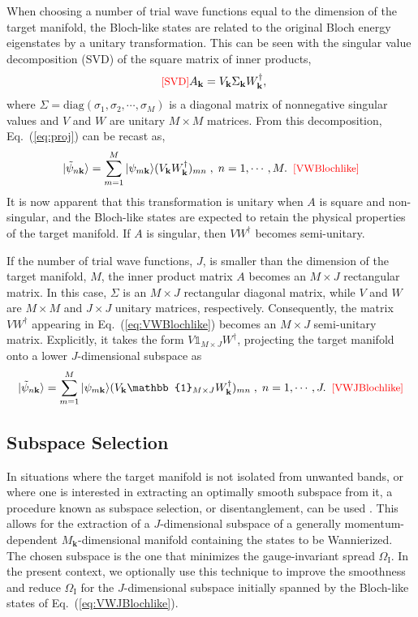 \documentclass[galley,aps,pra,10pt,amsmath,amssymb,
    superscriptaddress,nofootinbib,longbibliography]{revtex4-2}
\def\Red#1{\textcolor{red}{#1}}
\newcounter{comm}
\newcommand{\seclab}[1]{\label{sec:#1}{\Red{\small\;\;[sec:~#1]}}}
\newcommand{\eqlab}[1]{\Red{\hbox{\small\;\;[#1]}}\label{eq:#1}}
\newcommand{\eqlab}[1]{\label{eq:#1}}
\newcommand{\seclab}[1]{\label{sec:#1}}
\newcommand{\eq}[1]{Eq.~(\ref{eq:#1})}
\begin{document}
When choosing a number of trial wave functions equal to the dimension of the target manifold, the Bloch-like states are related to the original Bloch energy eigenstates by a unitary transformation. This can be seen with the singular value decomposition (SVD) of the square matrix of inner products, 
\begin{equation}
\eqlab{SVD}
    A_{\mathbf{k}} = V_{\mathbf{k}} \Sigma_{\mathbf{k}} W_{\mathbf{k}}^{\dagger} ,
\end{equation} 
where $\Sigma = \text{diag}(\sigma_1, \sigma_2, \cdots, \sigma_M)$ is a diagonal matrix of nonnegative singular values and $V$ and $W$ are unitary $M\times M$ matrices. From this decomposition, \eq{proj} can be recast as,
\begin{equation}
|\tilde{\psi}_{n\mathbf{k}} \rangle = \sum_{m=1}^M |\psi_{m\mathbf{k}} \rangle (V_{\mathbf{k}}W_{\mathbf{k}}^{\dagger})_{mn} \;,\;n=1,\cdots,M.
\eqlab{VWBlochlike}
\end{equation}
It is now apparent that this transformation is unitary when $A$ is square and non-singular, and the Bloch-like states are expected to retain the physical properties of the target manifold. If $A$ is singular, then $VW^{\dagger}$ becomes semi-unitary.

If the number of trial wave functions, $J$, is smaller than the dimension of the target manifold, $M$, the inner product matrix $A$ becomes an $M \times J$ rectangular matrix. In this case, $\Sigma$ is an $M\times J$ rectangular diagonal matrix, while $V$ and $W$ are $M\times M$ and $J \times J$ unitary matrices, respectively. Consequently, the matrix $VW^{\dagger}$ appearing in \eq{VWBlochlike} becomes an $M \times J$ semi-unitary matrix. Explicitly, it takes the form $V \mathbb{1}_{M \times J} W^{\dagger}$, projecting the target manifold onto a lower $J$-dimensional subspace as
\begin{equation}
|\tilde{\psi}_{n\mathbf{k}} \rangle = \sum_{m=1}^M |\psi_{m\mathbf{k}} \rangle (V_{\mathbf{k}}\mathbb{1}_{M \times J}W_{\mathbf{k}}^{\dagger})_{mn} \;,\;n=1,\cdots, J .
\eqlab{VWJBlochlike}
\end{equation}

\subsection{Subspace Selection}
\seclab{selection}

In situations where the target manifold is not isolated from unwanted bands, or where one is interested in extracting an optimally smooth subspace from it, a procedure known as subspace selection, or disentanglement, can be used \cite{souza2001}. This allows for the extraction of a $J$-dimensional subspace of a generally momentum-dependent $M_{\mathbf{k}}$-dimensional manifold containing the states to be Wannierized. The chosen subspace is the one that minimizes the gauge-invariant spread $\Omega_\textrm{I}$. In the present context, we optionally use this technique to improve the smoothness and reduce $\Omega_\textrm{I}$ for the $J$-dimensional subspace initially spanned by the Bloch-like states of \eq{VWJBlochlike}.
\end{document}
